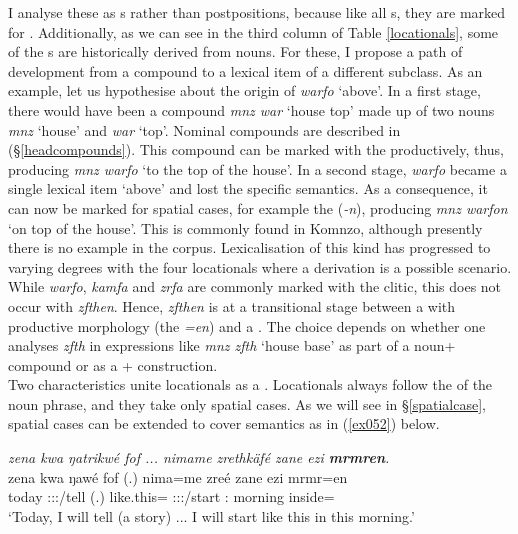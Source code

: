 I analyse these as  s rather than postpositions, because like all s, they are marked for . Additionally, as we can see in the third column of Table \ref{locationals}, some of the  s are historically derived from nouns. For these, I propose a path of development from a  compound to a lexical item of a different  subclass. As an example, let us hypothesise about the origin of \emph{warfo} `above'. In a first stage, there would have been a  compound \emph{mnz war} `house top' made up of two nouns \emph{mnz} `house' and \emph{war} `top'. Nominal compounds are described in (\S{}\ref{headcompounds}). This compound can be marked with the   productively, thus, producing \emph{mnz warfo} `to the top of the house'. In a second stage, \emph{warfo} became a single lexical item `above' and lost the specific  semantics. As a consequence, it can now be marked for spatial cases, for example the   (\emph{-n}), producing \emph{mnz warfon} `on top of the house'. This is commonly found in Komnzo, although presently there is no example in the corpus. Lexicalisation of this kind has progressed to varying degrees with the four locationals where a  derivation is a possible scenario. While \emph{warfo}, \emph{kamfa} and \emph{zrfa} are commonly marked with the   clitic, this does not occur with \emph{zfthen}. Hence, \emph{zfthen} is at a transitional stage between a  with productive morphology (the   \emph{=en}) and a . The choice depends on whether one analyses \emph{zfth} in expressions like \emph{mnz zfth} `house base' as part of a noun+ compound or as a + construction.\\

Two characteristics unite locationals as a . Locationals always follow the  of the noun phrase, and they take only spatial cases. As we will see in \S{}\ref{spatialcase}, spatial cases can be extended to cover  semantics as in (\ref{ex052}) below.

\begin{exe}
	\ex \emph{zena kwa ŋatrikwé fof ... nimame zrethkäfé zane ezi \textbf{mrmren}.}\\
	\gll zena kwa ŋawé fof (.) nima=me zreé zane ezi mrmr=en\\
	today \Fut{} \Fsg:\Sbj:\Nonpast:\Ipfv/tell \Emph{} (.) {like.this}=\Ins{} \Fsg:\Sbj:\Irr:\Pfv/start \Dem:\Prox{} morning inside=\Loc{}\\
	\trans `Today, I will tell (a story) ... I will start like this in this morning.'\\
	\label{ex052}
\end{exe}

